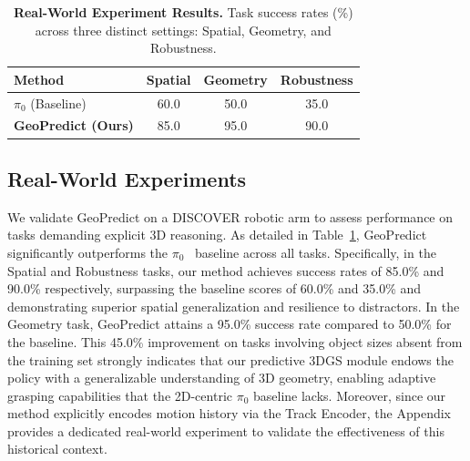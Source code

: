\begin{table}[t]
\centering
\small
\caption{\textbf{Real-World Experiment Results.} Task success rates (\%) across three distinct settings: Spatial, Geometry, and Robustness.}
\vspace{-5pt}
\begin{tabular}{l | c c c}
\toprule
\textbf{Method} & \textbf{Spatial} & \textbf{Geometry} & \textbf{Robustness}\\
\midrule
$\pi_0$ (Baseline)~\cite{black2410pi0} & 60.0 & 50.0 & 35.0  \\
\textbf{GeoPredict (Ours)} & 85.0 & 95.0 & 90.0 \\
\bottomrule
\end{tabular}
\label{tab:real}
\vspace{-7pt}
\end{table}


\subsection{Real-World Experiments} \label{sec:real_world}
We validate GeoPredict on a DISCOVER robotic arm to assess performance on tasks demanding explicit 3D reasoning. As detailed in Table~\ref{tab:real}, GeoPredict significantly outperforms the $\pi_0$~\cite{black2410pi0} baseline across all tasks. Specifically, in the Spatial and Robustness tasks, our method achieves success rates of 85.0\% and 90.0\% respectively, surpassing the baseline scores of 60.0\% and 35.0\% and demonstrating superior spatial generalization and resilience to distractors. In the Geometry task, GeoPredict attains a 95.0\% success rate compared to 50.0\% for the baseline. This 45.0\% improvement on tasks involving object sizes absent from the training set strongly indicates that our predictive 3DGS module endows the policy with a generalizable understanding of 3D geometry, enabling adaptive grasping capabilities that the 2D-centric $\pi_0$ baseline lacks. Moreover, since our method explicitly encodes motion history via the Track Encoder, the Appendix provides a dedicated real-world experiment to validate the effectiveness of this historical context.
